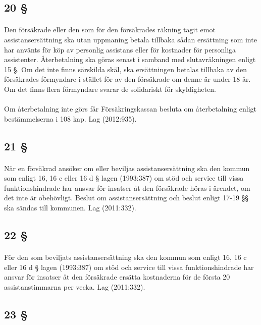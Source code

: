 \documentclass[a4paper,notitlepage,openany,10pt]{book}
\begin{document}
\subsection*{20 §}
\paragraph*{}
Den försäkrade eller den som för den försäkrades räkning tagit emot assistansersättning ska utan uppmaning betala tillbaka sådan ersättning som inte har använts för köp av personlig assistans eller för kostnader för personliga assistenter. Återbetalning ska göras senast i samband med slutavräkningen enligt 15 §. Om det inte finns särskilda skäl, ska ersättningen betalas tillbaka av den försäkrades förmyndare i stället för av den försäkrade om denne är under 18 år. Om det finns flera förmyndare svarar de solidariskt för skyldigheten.
\paragraph*{}
Om återbetalning inte görs får Försäkringskassan besluta om återbetalning enligt bestämmelserna i 108 kap.
Lag (2012:935).
\subsection*{21 §}
\paragraph*{}
När en försäkrad ansöker om eller beviljas assistansersättning ska den kommun som enligt 16, 16 c eller 16 d § lagen (1993:387) om stöd och service till vissa funktionshindrade har ansvar för insatser åt den försäkrade höras i ärendet, om det inte är obehövligt.
Beslut om assistansersättning och beslut enligt 17-19 §§ ska sändas till kommunen.
Lag (2011:332).
\subsection*{22 §}
\paragraph*{}
För den som beviljats assistansersättning ska den kommun som enligt 16, 16 c eller 16 d § lagen (1993:387) om stöd och service till vissa funktionshindrade har ansvar för insatser åt den försäkrade ersätta kostnaderna för de första 20 assistanstimmarna per vecka.
Lag (2011:332).
\subsection*{23 §}
\end{document}
